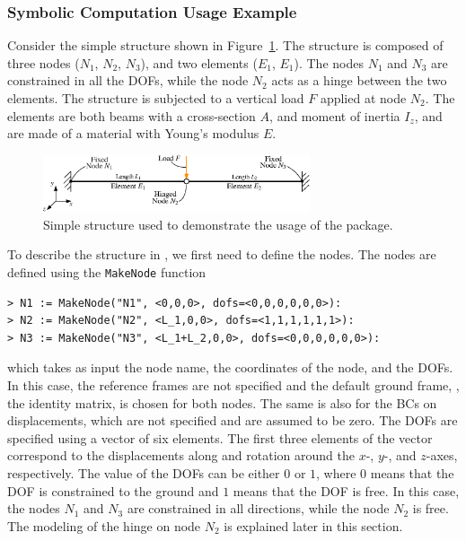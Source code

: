 \subsubsection*{\TrussMe{} Symbolic Computation Usage Example}

Consider the simple structure shown in Figure~\ref{chap7:fig:usage_example}. The structure is composed of three nodes ($N_1$, $N_2$, $N_3$), and two elements ($E_1$, $E_1$). The nodes $N_1$ and $N_3$ are constrained in all the \acp{DOF}, while the node $N_2$ acts as a hinge between the two elements. The structure is subjected to a vertical load $F$ applied at node $N_2$. The elements are both beams with a cross-section $A$, and moment of inertia $I_z$, and are made of a material with Young's modulus $E$.

\begin{figure}[!ht]
  \centering
  \includegraphics[width=0.7\textwidth]{./figures/chapter_7/usage_example.eps}
  \caption{Simple structure used to demonstrate the usage of the \TrussMe{} package.}
  \label{chap7:fig:usage_example}
\end{figure}

To describe the structure in \TrussMe{}, we first need to define the nodes. The nodes are defined using the \texttt{MakeNode} function
%
\begin{verbatim}
> N1 := MakeNode("N1", <0,0,0>, dofs=<0,0,0,0,0,0>):
> N2 := MakeNode("N2", <L_1,0,0>, dofs=<1,1,1,1,1,1>):
> N3 := MakeNode("N3", <L_1+L_2,0,0>, dofs=<0,0,0,0,0,0>):
\end{verbatim}
%
which takes as input the node name, the coordinates of the node, and the \acp{DOF}. In this case, the reference frames are not specified and the default ground frame, \ie{}, the identity matrix, is chosen for both nodes. The same is also for the \acp{BC} on displacements, which are not specified and are assumed to be zero. The \acp{DOF} are specified using a vector of six elements. The first three elements of the vector correspond to the displacements along and rotation around the $x$-, $y$-, and $z$-axes, respectively. The value of the \acp{DOF} can be either $0$ or $1$, where $0$ means that the \ac{DOF} is constrained to the ground and $1$ means that the \ac{DOF} is free. In this case, the nodes $N_1$ and $N_3$ are constrained in all directions, while the node $N_2$ is free. The modeling of the hinge on node $N_2$ is explained later in this section.

